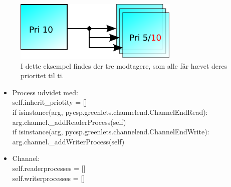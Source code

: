 \begin{figure}
 \begin{center}
  \includegraphics[scale=1.00]{images/any-to-any-inheritance}
  \caption{I dette eksempel findes der tre modtagere, som alle får hævet deres prioritet til ti.}
  \label{fig:any-to-any-inheritance}
  \end{center}
\end{figure}

\begin{itemize}
\tightlist
\item Process udvidet med: \\self.inherit\_priotity = []     \\
            if isinstance(arg, pycsp.greenlets.channelend.ChannelEndRead):\\
                arg.channel.\_addReaderProcess(self)\\
            if isinstance(arg, pycsp.greenlets.channelend.ChannelEndWrite):\\
                arg.channel.\_addWriterProcess(self)
\item Channel:\\
        self.readerprocesses = []\\
        self.writerprocesses = []
\end{itemize}
